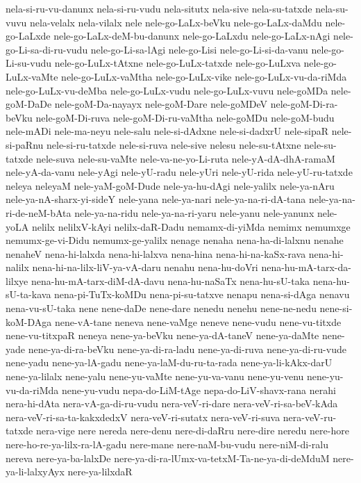 {nela-si-ru-vu-danunx
nela-si-ru-vudu
nela-situtx
nela-sive
nela-su-tatxde
nela-su-vuvu
nela-velalx
nela-vilalx
nele
nele-go-LaLx-beVku
nele-go-LaLx-daMdu
nele-go-LaLxde
nele-go-LaLx-deM-bu-danunx
nele-go-LaLxdu
nele-go-LaLx-nAgi
nele-go-Li-sa-di-ru-vudu
nele-go-Li-sa-lAgi
nele-go-Lisi
nele-go-Li-si-da-vanu
nele-go-Li-su-vudu
nele-go-LuLx-tAtxne
nele-go-LuLx-tatxde
nele-go-LuLxva
nele-go-LuLx-vaMte
nele-go-LuLx-vaMtha
nele-go-LuLx-vike
nele-go-LuLx-vu-da-riMda
nele-go-LuLx-vu-deMba
nele-go-LuLx-vudu
nele-go-LuLx-vuvu
nele-goMDa
nele-goM-DaDe
nele-goM-Da-nayayx
nele-goM-Dare
nele-goMDeV
nele-goM-Di-ra-beVku
nele-goM-Di-ruva
nele-goM-Di-ru-vaMtha
nele-goMDu
nele-goM-budu
nele-mADi
nele-ma-neyu
nele-salu
nele-si-dAdxne
nele-si-dadxrU
nele-sipaR
nele-si-paRnu
nele-si-ru-tatxde
nele-si-ruva
nele-sive
nelesu
nele-su-tAtxne
nele-su-tatxde
nele-suva
nele-su-vaMte
nele-va-ne-yo-Li-ruta
nele-yA-dA-dhA-ramaM
nele-yA-da-vanu
nele-yAgi
nele-yU-radu
nele-yUri
nele-yU-rida
nele-yU-ru-tatxde
neleya
neleyaM
nele-yaM-goM-Dude
nele-ya-hu-dAgi
nele-yalilx
nele-ya-nAru
nele-ya-nA-sharx-yi-sideY
nele-yana
nele-ya-nari
nele-ya-na-ri-dA-tana
nele-ya-na-ri-de-neM-bAta
nele-ya-na-ridu
nele-ya-na-ri-yaru
nele-yanu
nele-yanunx
nele-yoLA
nelilx
nelilxV-kAyi
nelilx-daR-Dadu
nemamx-di-yiMda
nemimx
nemumxge
nemumx-ge-vi-Didu
nemumx-ge-yalilx
nenage
nenaha
nena-ha-di-lalxnu
nenahe
nenaheV
nena-hi-lalxda
nena-hi-lalxva
nena-hina
nena-hi-na-kaSx-rava
nena-hi-nalilx
nena-hi-na-lilx-liV-ya-vA-daru
nenahu
nena-hu-doVri
nena-hu-mA-tarx-da-lilxye
nena-hu-mA-tarx-diM-dA-davu
nena-hu-naSaTx
nena-hu-sU-taka
nena-hu-sU-ta-kava
nena-pi-TuTx-koMDu
nena-pi-su-tatxve
nenapu
nena-si-dAga
nenavu
nena-vu-sU-taka
nene
nene-daDe
nene-dare
nenedu
nenehu
nene-ne-nedu
nene-si-koM-DAga
nene-vA-tane
neneva
nene-vaMge
neneve
nene-vudu
nene-vu-titxde
nene-vu-titxpaR
neneya
nene-ya-beVku
nene-ya-dA-taneV
nene-ya-daMte
nene-yade
nene-ya-di-ra-beVku
nene-ya-di-ra-ladu
nene-ya-di-ruva
nene-ya-di-ru-vude
nene-yadu
nene-ya-lA-gadu
nene-ya-laM-du-ru-ta-rada
nene-ya-li-kAkx-darU
nene-ya-lilalx
nene-yalu
nene-yu-vaMte
nene-yu-va-vanu
nene-yu-venu
nene-yu-vu-da-riMda
nene-yu-vudu
nepa-do-LiM-tAge
nepa-do-LiV-shavx-rana
nerahi
nera-hi-dAta
nera-vA-ga-di-ru-vudu
nera-veV-ri-dare
nera-veV-ri-sa-beV-kAda
nera-veV-ri-sa-ta-kakxdedxV
nera-veV-ri-sutatx
nera-veV-ri-suva
nera-veV-ru-tatxde
nera-vige
nere
nereda
nere-denu
nere-di-daRru
nere-dire
neredu
nere-hore
nere-ho-re-ya-lilx-ra-lA-gadu
nere-mane
nere-naM-bu-vudu
nere-niM-di-ralu
nereva
nere-ya-ba-lalxDe
nere-ya-di-ra-lUmx-va-tetxM-Ta-ne-ya-di-deMduM
nere-ya-li-lalxyAyx
nere-ya-lilxdaR
}
